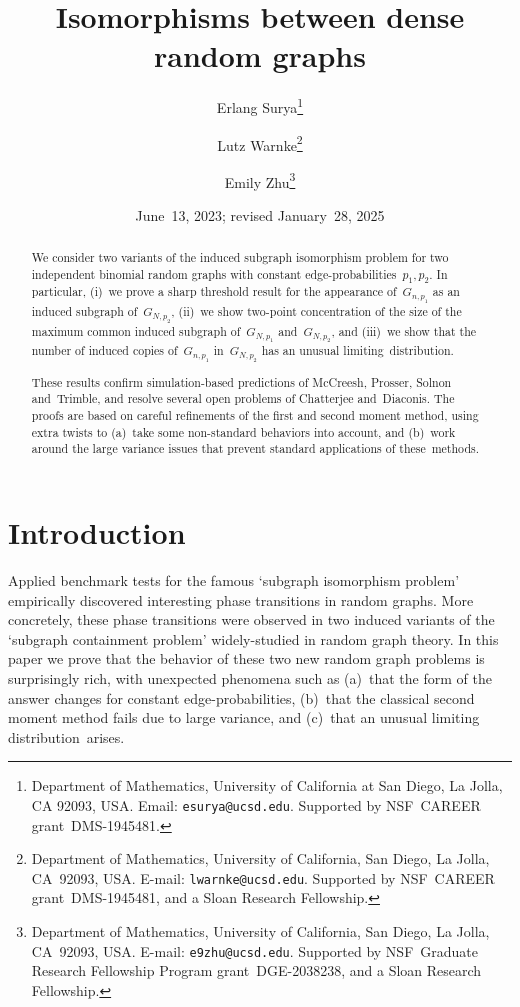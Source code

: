 \documentclass{article}
\title{Isomorphisms between dense random graphs}
\author{Erlang Surya\thanks{Department of Mathematics, University of California at San Diego, La Jolla, CA 92093, USA. Email: {\tt esurya@ucsd.edu}. Supported by NSF~CAREER grant~DMS-1945481.}
\and
Lutz Warnke\thanks{Department of Mathematics, University of California, San Diego, La Jolla, CA~92093, USA. 
E-mail: {\tt lwarnke@ucsd.edu}. 
Supported by NSF~CAREER grant~DMS-1945481, and a Sloan Research Fellowship.}
\and
Emily Zhu\thanks{Department of Mathematics, University of California, San Diego, La Jolla, CA~92093, USA. 
E-mail: {\tt e9zhu@ucsd.edu}. 
Supported by NSF~Graduate Research Fellowship Program grant~DGE-2038238, and a Sloan Research Fellowship.}}
\date{June~13, 2023; revised January~28, 2025}
\begin{document}
\maketitle

\begin{abstract}
We consider two variants of the induced subgraph isomorphism problem for two independent binomial random graphs with constant edge-probabilities~$p_1,p_2$.  
In particular, 
(i)~we prove a sharp threshold result for the appearance of~$G_{n,p_1}$ as an induced subgraph of~$G_{N,p_2}$, 
(ii)~we show two-point concentration of the size of the maximum common induced subgraph of~$G_{N, p_1}$ and~$G_{N,p_2}$,
and (iii)~we show that the number of induced copies of~$G_{n,p_1}$ in~$G_{N,p_2}$ has an unusual limiting~distribution.

These results confirm simulation-based predictions of McCreesh, Prosser, Solnon and~Trimble, and resolve several open problems of Chatterjee and~Diaconis.
The proofs are based on careful refinements of the first and second moment method, 
using extra twists to 
(a)~take some non-standard behaviors into account, and 
(b)~work around the large variance issues that prevent standard applications of these~methods. 
\end{abstract}

\section{Introduction}
Applied benchmark tests for the famous `subgraph isomorphism problem' empirically discovered interesting phase transitions in random graphs. 
More concretely, these phase transitions were observed in two induced variants of the `subgraph containment problem' widely-studied in random graph theory. 
In this paper we prove that the behavior of these two new random graph problems is surprisingly rich, 
with unexpected phenomena such as 
(a)~that the form of the answer changes for constant edge-probabilities, 
(b)~that the classical second moment method fails due to large variance, and 
(c)~that an unusual limiting distribution~arises. 
\end{document}
